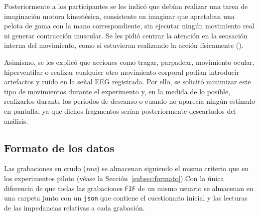 Posteriormente a los participantes se les indicó que debían realizar una tarea de imaginación motora kinestésica, consistente en imaginar que apretaban una pelota de goma con la mano correspondiente, sin ejecutar ningún movimiento real ni generar contracción muscular. Se les pidió centrar la atención en la sensación interna del movimiento, como si estuvieran realizando la acción físicamente (\cite{Kinestetic}).

Asimismo, se les explicó que acciones como tragar, parpadear, movimiento ocular, hiperventilar o realizar cualquier otro movimiento corporal podían introducir artefactos y ruido en la señal EEG registrada. Por ello, se solicitó minimizar este tipo de movimientos durante el experimento y, en la medida de lo posible, realizarlos durante los periodos de descanso o cuando no aparecía ningún estímulo en pantalla, ya que dichos fragmentos serían posteriormente descartados del análisis.

\subsection{Formato de los datos}

Las grabaciones en crudo (\textit{raw}) se almacenan siguiendo el mismo criterio que en los experimentos piloto (véase la Sección~\ref{subsec:formato}).Con la única diferencia de que todas las grabaciones \texttt{FIF} de un mismo usuario se almacenan en una carpeta junto con un \texttt{json} que contiene el cuestionario inicial y las lecturas de las impedancias relativas a cada grabación.